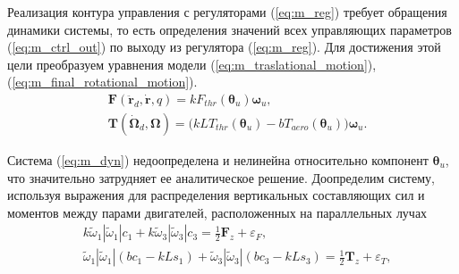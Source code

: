 Реализация контура управления с регуляторами (\ref{eq:m_reg}) требует обращения динамики системы, то есть определения значений всех управляющих параметров (\ref{eq:m_ctrl_out}) по выходу из регулятора (\ref{eq:m_reg}).
Для достижения этой цели преобразуем уравнения модели (\ref{eq:m_traslational_motion}), (\ref{eq:m_final_rotational_motion}).
\begin{equation} \label{eq:m_dyn}
\begin{aligned}
&\bm F(\ddot{\bm r}_d, \dot{\bm r}, q) = k F_{thr} (\bm \theta_u) \bm \omega_u,\\
&\bm T(\dot{\bm \Omega}_d, \bm\Omega) = \Big(
kLT_{thr}(\bm\theta_u) - bT_{aero}(\bm\theta_u)
\Big)
\bm \omega_u.
\end{aligned}
\end{equation}

Система (\ref{eq:m_dyn}) недоопределена и нелинейна относительно компонент $\bm \theta_u$, что значительно затрудняет ее аналитическое решение. Доопределим систему, используя выражения для распределения вертикальных составляющих сил и моментов между парами двигателей, расположенных на параллельных лучах
\begin{equation} \label{eq:m_dyn_balance_1}
\begin{aligned}
&k \tilde\omega_1 |\tilde\omega_1| c_1 + k \tilde\omega_3 |\tilde\omega_3| c_3 =
\frac{1}{2} \bm F_z + \varepsilon_F,
\\
&\tilde\omega_1 |\tilde\omega_1| (bc_1 - kLs_1)
+ \tilde\omega_3 |\tilde\omega_3| (bc_3 - kLs_3) =
\frac{1}{2} \bm T_z + \varepsilon_T,
\end{aligned}
\end{equation}

